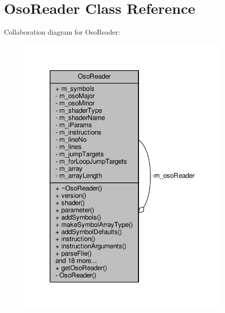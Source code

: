 \hypertarget{class_oso_reader}{\section{Oso\-Reader Class Reference}
\label{class_oso_reader}
}


Collaboration diagram for Oso\-Reader\-:
\nopagebreak
\begin{figure}[H]
\begin{center}
\leavevmode
\includegraphics[width=299pt]{class_oso_reader__coll__graph}
\end{center}
\end{figure}
